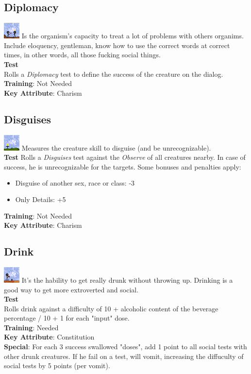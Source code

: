 \documentclass[ letterpaper,12pt]{article}
\begin{document}
\subsection{Diplomacy}
\includegraphics{../data/skills/Img/diplomacia.png}
Is the organism's capacity to treat a lot of problems with others organims. Include eloquency, gentleman, know how to use the correct words at correct times, in other words, all those fucking social things.\\
{\bf Test}\\
Rolls a {\it Diplomacy} test to define the success of the creature on the dialog.\\
{\bf Training}: Not Needed\\
{\bf Key Attribute}: Charism

\subsection{Disguises}
\includegraphics{../data/skills/Img/disfarces.png}
Measures the creature skill to disguise (and be unrecognizable).\\
{\bf Test}
Rolls a {\it Disguises} test against the {\it Observe} of all creatures nearby. In case of success, he is unrecognizable for the targets. Some bonuses and penalties apply:
\begin{itemize}
\item{Disguise of another sex, race or class:  -3}
\item{Only Details:  +5}
\end{itemize}
{\bf Training}: Not Needed\\
{\bf Key Attribute}: Charism

\subsection{Drink}
\includegraphics{../data/skills/Img/beber.png}
It's the hability to get really drunk without throwing up. Drinking is a good way to get more extroverted and social.\\
{\bf Test}\\
Rolls drink against a difficulty of 10 + alcoholic content of the beverage percentage / 10 + 1 for each "input" dose.\\
{\bf Training}: Needed\\
{\bf Key Attribute}: Constitution\\
{\bf Special}: For each 3 success swallowed "doses", add 1 point to all social tests with other drunk creatures. If he fail on a test, will vomit, increasing the diffuculty of social tests by 5 points (per vomit).
\end{document}
